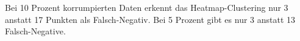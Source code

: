 \documentclass[11pt,a4paper]{article}
\numberwithin{equation}{section}
\begin{document}
	Bei 10 Prozent korrumpierten Daten erkennt das Heatmap-Clustering nur 3 anstatt 17 Punkten als Falsch-Negativ. Bei 5 Prozent gibt es nur 3 anstatt 13 Falsch-Negative.
	

\end{document}
